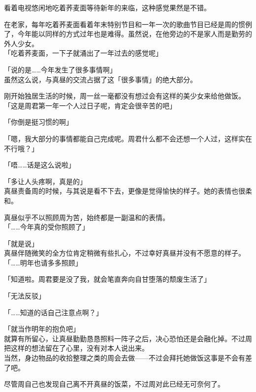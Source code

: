 看着电视悠闲地吃着荞麦面等待新年的来临，这种感觉果然是不错。

在老家，每年吃着荞麦面看着年末特别节目和一年一次的歌曲节目已经是周的惯例了，今年能以同样的方式过年也是难得。虽然说，在他旁边的不是家人而是勤劳的外人少女。\\

「吃着荞麦面，一下子就涌出了一年过去的感觉呢」

「说的是……今年发生了很多事情啊」\\

虽然这么说，与真昼的交流占据了这「很多事情」的绝大部分。

刚开始独居生活的时候，周一丝一毫都没有想过会有这样的美少女来给他做饭。\\

「这是周君第一年一个人过日子呢，肯定会很辛苦的吧」

「你倒是挺习惯的啊」

「嗯，我大部分的事情都能自己完成呢。周君什么都不会还想一个人过，这样实在不行哦？」

「唔……话是这么说啦」

「多让人头疼啊，真是的」\\

真昼责备周的时候，与其说是看不下去，更像是觉得愉快的样子。她的表情也很柔和。

真昼似乎不以照顾周为苦，始终都是一副温和的表情。\\

「……今年真的受你照顾了」

「就是说」\\

真昼伴随微笑的全方位肯定稍微有些扎心，不过幸好真昼并没有不愿意的样子。\\

「……明年也请多多照顾」

「知道啦。周君要是没了我，就会笔直奔向自甘堕落的颓废生活了」

「无法反驳」

「……知道的话自己注意点啊？」

「就当作明年的抱负吧」\\

就算有所留心，让真昼勤勤恳恳照料一阵子之后，决心恐怕还是会融化掉。不过周把这样的想法留在了心里，没有对本人说出来。\\

当然，身边物品的收拾整理之类的周会去做——不过会拜托她做饭这事是不会有差了吧。

尽管周自己也发现自己离不开真昼的饭菜，不过周对此已经无可奈何了。\\

